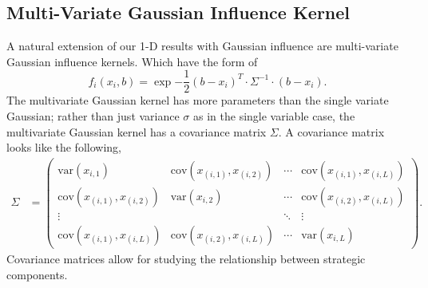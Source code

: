 \documentclass{article}
\begin{document}
        \subsection{Multi-Variate Gaussian Influence Kernel}
             A natural extension of our 1-D results with Gaussian influence are multi-variate Gaussian influence kernels. Which have the form of
            \begin{equation}
                f_{i}(x_i,b)=\exp{-\frac{1}{2}(b-x_i)^T\cdot \Sigma^{-1} \cdot (b-x_i)}.
            \end{equation}
             The multivariate Gaussian kernel has more parameters than the single variate Gaussian; rather than just variance $\sigma$ as in the single variable case, the multivariate Gaussian kernel has a covariance matrix $\Sigma$. A covariance matrix looks like the following, 
            \begin{align}
                \Sigma&=\begin{pmatrix}
                    \text{var}(x_{i,1}) & \text{cov}(x_{(i,1)},x_{(i,2)})& \cdots &  \text{cov}(x_{(i,1)},x_{(i,L)}) \\ %
                    \text{cov}(x_{(i,1)},x_{(i,2)}) & \text{var}(x_{i,2})& \cdots &  \text{cov}(x_{(i,2)},x_{(i,L)}) \\ %
                   \vdots & & \ddots &\vdots   \\ %
                    \text{cov}(x_{(i,1)},x_{(i,L)}) & \text{cov}(x_{(i,2)},x_{(i,L)})& \cdots &  \text{var}(x_{i,L})
                \end{pmatrix}.
            \end{align}
            Covariance matrices allow for studying the relationship between strategic components. 
\end{document}
